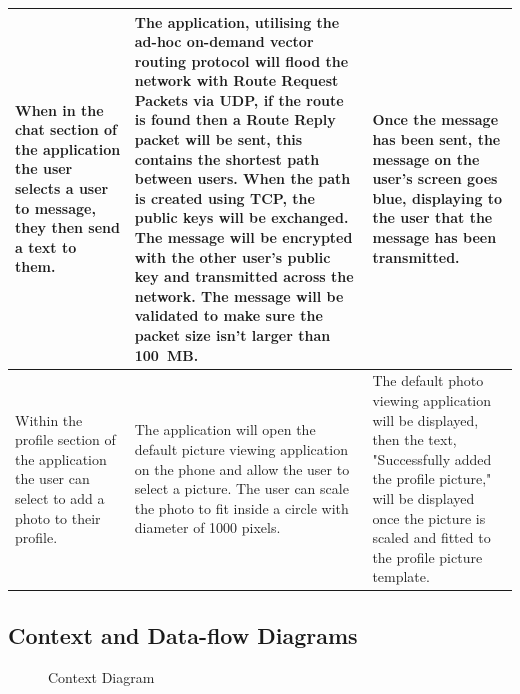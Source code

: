 \documentclass[a4paper, titlepage]{article}
\begin{document}
\begin{tabularx}{\linewidth}{ |*{3}{X|}}
	\hline\hline
	When in the chat section of the application the user selects a user to message, they then send a text to them. & The application, utilising the ad-hoc on-demand vector routing protocol will flood the network with Route Request Packets via UDP, if the route is found then a Route Reply packet will be sent, this contains the shortest path between users. When the path is created using TCP, the public keys will be exchanged. The message will be encrypted with the other user's public key and transmitted across the network. The message will be validated to make sure the packet size isn't larger than 100 MB. & Once the message has been sent, the message on the user's screen goes blue, displaying to the user that the message has been transmitted. \\
	\hline\hline
	Within the profile section of the application the user can select to add a photo to their profile. & The application will open the default picture viewing application on the phone and allow the user to select a picture. The user can scale the photo to fit inside a circle with diameter of 1000 pixels. & The default photo viewing application will be displayed, then the text, "Successfully added the profile picture," will be displayed once the picture is scaled and fitted to the profile picture template.\\
\hline
\end{tabularx}

\subsection{Context and Data-flow Diagrams}
\vspace{2cm}
\begin{figure}[H]
\caption{Context Diagram}
\vspace{1cm}
\centering
{}
\end{figure}
\end{document}
